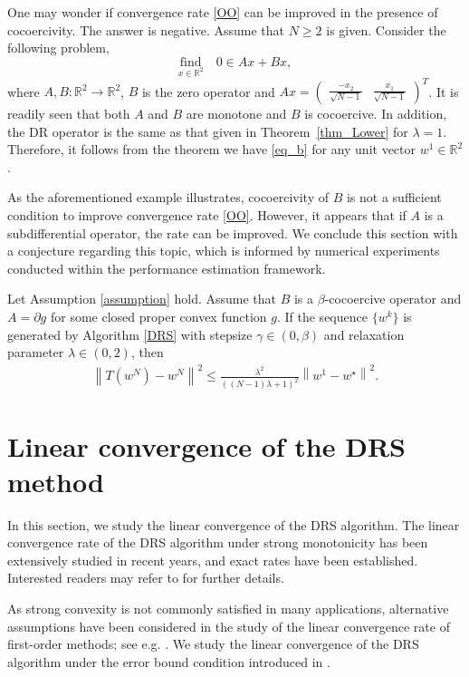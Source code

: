 \documentclass[ijoc,sglanonrev]{informs4}
\begin{document}
One may wonder if convergence rate \eqref{OO} can be improved in the presence of cocoercivity. The answer is negative. Assume that $N\geq 2$ is given. Consider the following problem,
$$
\underset{x\in\mathbb{R}^2}{\text{find}}\quad 0 \in Ax+Bx,
$$
where $A, B:\mathbb{R}^2\to \mathbb{R}^2$, $B$ is the zero operator and 
$Ax=\begin{pmatrix}
    \tfrac{-x_2}{\sqrt{N-1}} &  \tfrac{x_1}{\sqrt{N-1}}
\end{pmatrix}^T$. 
It is readily seen that both $A$ and $B$ are monotone and $B$ is cocoercive. In addition, the DR operator is the same as that given in Theorem~\ref{thm_Lower} for $\lambda=1$. Therefore, it follows from the theorem we have  \eqref{eq_b} for any unit vector $w^1\in\mathbb{R}^2$.

As the aforementioned example illustrates, cocoercivity of $B$ is not a sufficient condition to improve convergence rate \eqref{OO}. However, it appears that if $A$ is a subdifferential operator, the rate can be improved. We conclude this section with a conjecture regarding this topic, which is informed by numerical experiments conducted within the performance estimation framework. 

\begin{conjecture} \label{Conjecture_1}
Let Assumption \ref{assumption} hold.  Assume that $B$ is a $\beta$-cocoercive operator and $A=\partial g$ for some closed proper convex function $g$. If the sequence $\{w^k\}$ is generated by Algorithm \ref{DRS} with stepsize $\gamma\in (0, \beta)$ and relaxation parameter $\lambda\in (0, 2)$, then 
\begin{align*}
\left\|T(w^N) - w^N\right\|^2 \leq  \tfrac{\lambda^2}{((N-1)\lambda+1)^2} \left\|w^1 - w^\star\right\|^2. 
\end{align*}
\end{conjecture}
\section{Linear convergence  of the DRS method}\label{Lin_S}
In this section, we study the linear convergence of the DRS algorithm. 
The linear convergence rate of the DRS algorithm under strong monotonicity has been extensively studied in recent years, and exact rates have been established. Interested readers may refer to \cite{giselsson2017tight, giselsson2016linear,ryu2020operator} for further details.

As strong convexity is not commonly satisfied in many applications, alternative assumptions have been considered in the study of the linear convergence rate of first-order methods; see e.g. \cite{aspelmeier2016local,karimi2016linear,zamani2024convergence}. We study the linear convergence of the DRS algorithm under the error bound condition introduced in \cite{pena2021linear}. 
\end{document}
